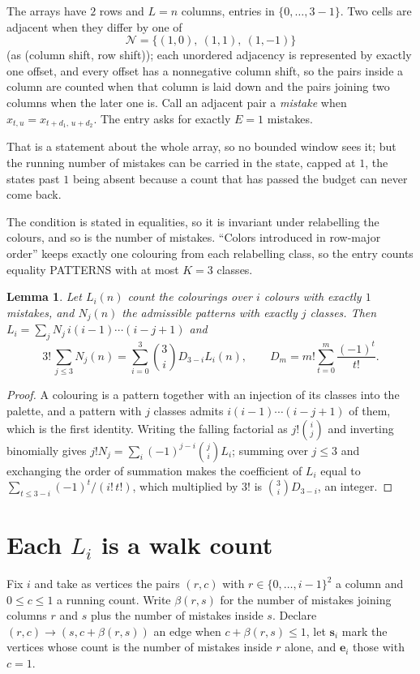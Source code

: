 \documentclass[11pt,a4paper]{article}
\theoremstyle{plain}
\newtheorem{lemma}[theorem]{Lemma}
\theoremstyle{definition}
\begin{document}
The arrays have $2$ rows and $L=n$ columns, entries in $\{0,\dots,3-1\}$.
Two cells are adjacent when they differ by one of
\[
\mathcal N=\{(1,0),\ (1,1),\ (1,-1)\}
\]
(as (column shift, row shift)); each unordered adjacency is represented by exactly one
offset, and every offset has a nonnegative column shift, so the pairs inside a column are
counted when that column is laid down and the pairs joining two columns when the later one
is. Call an adjacent pair a \emph{mistake} when $x_{t,u}=x_{t+d_1,\,u+d_2}$. The entry asks for exactly
$E=1$ mistakes.

That is a statement about the whole array, so no bounded window sees it; but the running
number of mistakes can be carried in the state, capped at $1$, the states past $1$ being
absent because a count that has passed the budget can never come back.

The condition is stated in equalities, so it is invariant under relabelling the colours, and
so is the number of mistakes. ``Colors introduced in row-major order'' keeps exactly one
colouring from each relabelling class, so the entry counts equality PATTERNS with at most
$K=3$ classes.

\begin{lemma}\label{lem:inv}
Let $L_i(n)$ count the colourings over $i$ colours with exactly $1$ mistakes, and $N_j(n)$
the admissible patterns with exactly $j$ classes. Then
$L_i=\sum_j N_j\,i(i-1)\cdots(i-j+1)$ and
\[
3!\,\sum_{j\le3}N_j(n)=\sum_{i=0}^{3}\binom{3}{i}D_{3-i}L_i(n),
\qquad D_m=m!\sum_{t=0}^{m}\frac{(-1)^t}{t!} .
\]
\end{lemma}

\begin{proof}
A colouring is a pattern together with an injection of its classes into the palette, and a
pattern with $j$ classes admits $i(i-1)\cdots(i-j+1)$ of them, which is the first identity.
Writing the falling factorial as $j!\binom{i}{j}$ and inverting binomially gives
$j!N_j=\sum_i(-1)^{j-i}\binom{j}{i}L_i$; summing over $j\le3$ and exchanging the order
of summation makes the coefficient of $L_i$ equal to $\sum_{t\le3-i}(-1)^t/(i!\,t!)$,
which multiplied by $3!$ is $\binom{3}{i}D_{3-i}$, an integer.
\end{proof}

\section{Each $L_i$ is a walk count}

Fix $i$ and take as vertices the pairs $(r,c)$ with $r\in\{0,\dots,i-1\}^{2}$ a column
and $0\le c\le1$ a running count. Write $\beta(r,s)$ for the number of mistakes joining
columns $r$ and $s$ plus the number of mistakes inside $s$. Declare $(r,c)\to(s,c+\beta(r,s))$
an edge when $c+\beta(r,s)\le1$, let $\mathbf{s}_i$ mark the vertices whose count is the
number of mistakes inside $r$ alone, and $\mathbf{e}_i$ those with $c=1$.
\end{document}
